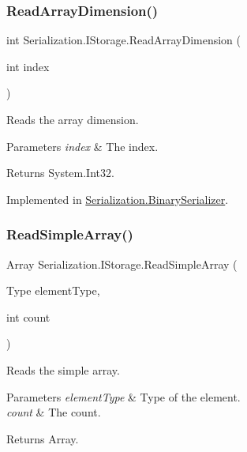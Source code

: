 \subsubsection{\texorpdfstring{Read\+Array\+Dimension()}{ReadArrayDimension()}}
{\footnotesize\ttfamily int Serialization.\+I\+Storage.\+Read\+Array\+Dimension (\begin{DoxyParamCaption}\item[{int}]{index }\end{DoxyParamCaption})}



Reads the array dimension. 


\begin{DoxyParams}{Parameters}
{\em index} & The index.\\
\hline
\end{DoxyParams}
\begin{DoxyReturn}{Returns}
System.\+Int32.
\end{DoxyReturn}


Implemented in \hyperlink{class_serialization_1_1_binary_serializer_a82cdd27cb419e14f93f62e0947d3c109}{Serialization.\+Binary\+Serializer}.

\mbox{\label{interface_serialization_1_1_i_storage_abffb20a2280b9334bef338ccd2d7f5f5}} 
\subsubsection{\texorpdfstring{Read\+Simple\+Array()}{ReadSimpleArray()}}
{\footnotesize\ttfamily Array Serialization.\+I\+Storage.\+Read\+Simple\+Array (\begin{DoxyParamCaption}\item[{Type}]{element\+Type,  }\item[{int}]{count }\end{DoxyParamCaption})}



Reads the simple array. 


\begin{DoxyParams}{Parameters}
{\em element\+Type} & Type of the element.\\
\hline
{\em count} & The count.\\
\hline
\end{DoxyParams}
\begin{DoxyReturn}{Returns}
Array.
\end{DoxyReturn}


